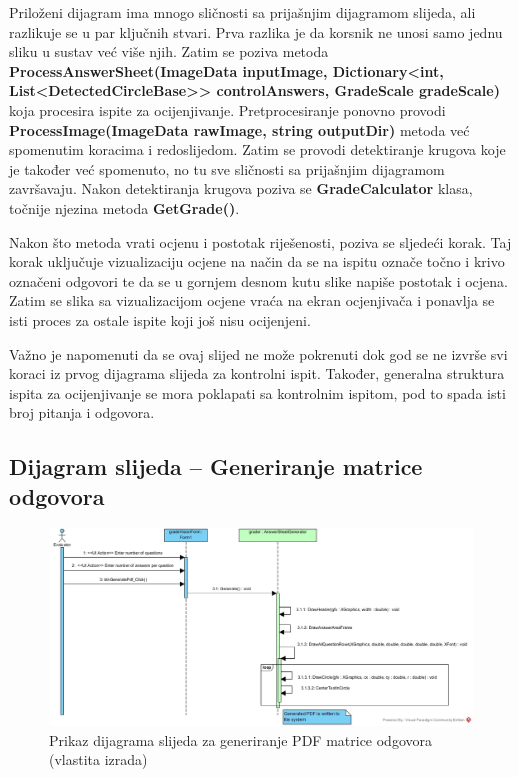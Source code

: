 \documentclass{foi}
\begin{document}
Priloženi dijagram ima mnogo sličnosti sa prijašnjim dijagramom slijeda, ali razlikuje se u par ključnih stvari. Prva razlika je da korsnik ne unosi samo jednu sliku u sustav već više njih. Zatim se poziva metoda \textbf{ProcessAnswerSheet(ImageData inputImage, Dictionary<int, List<DetectedCircleBase>> controlAnswers, GradeScale gradeScale)} koja procesira ispite za ocijenjivanje. Pretprocesiranje ponovno provodi \textbf{ProcessImage(ImageData rawImage, string outputDir)} metoda već spomenutim koracima i redoslijedom. Zatim se provodi detektiranje krugova koje je također već spomenuto, no tu sve sličnosti sa prijašnjim dijagramom završavaju. Nakon detektiranja krugova poziva se \textbf{GradeCalculator} klasa, točnije njezina metoda \textbf{GetGrade()}.

Nakon što metoda vrati ocjenu i postotak riješenosti, poziva se sljedeći korak. Taj korak uključuje vizualizaciju ocjene na način da se na ispitu označe točno i krivo označeni odgovori te da se u gornjem desnom kutu slike napiše postotak i ocjena. Zatim se slika sa vizualizacijom ocjene vraća na ekran ocjenjivača i ponavlja se isti proces za ostale ispite koji još nisu ocijenjeni.

Važno je napomenuti da se ovaj slijed ne može pokrenuti dok god se ne izvrše svi koraci iz prvog dijagrama slijeda za kontrolni ispit. Također, generalna struktura ispita za ocijenjivanje se mora poklapati sa kontrolnim ispitom, pod to spada isti broj pitanja i odgovora.

\subsection{Dijagram slijeda – Generiranje matrice odgovora}

\begin{figure}[H]
\centering
\includegraphics[width=1.0\linewidth]{slike/sequence3.jpg}
\caption{Prikaz dijagrama slijeda za generiranje PDF matrice odgovora (vlastita izrada)}
\end{figure}
\end{document}
